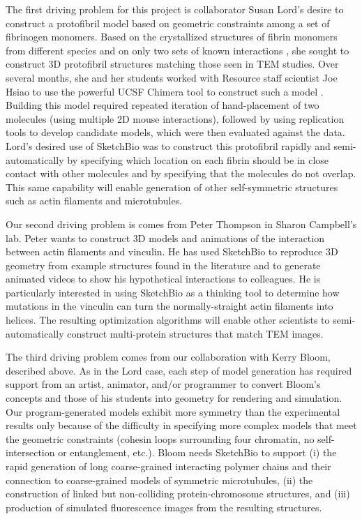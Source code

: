 \documentclass[twocolumn]{bmcart}%
\begin{document}
The first driving problem for this project is collaborator Susan Lord's desire to construct a protofibril model based on geometric constraints among a set of fibrinogen monomers.  Based on the crystallized structures of fibrin monomers from different species and on only two sets of known interactions \cite{lord2007fibrinogen}, she sought to construct 3D protofibril structures matching those seen in TEM studies.  Over several months, she and her students worked with Resource staff scientist Joe Hsiao to use the powerful UCSF Chimera tool to construct such a model \cite{lordSubmitted}.  Building this model required repeated iteration of hand-placement of two molecules (using multiple 2D mouse interactions), followed by using replication tools to develop candidate models, which were then evaluated against the data.  Lord's desired use of SketchBio was to construct this protofibril rapidly and semi-automatically by specifying which location on each fibrin should be in close contact with other molecules and by specifying that the molecules do not overlap.  This same capability will enable generation of other self-symmetric structures such as actin filaments and microtubules.

Our second driving problem is comes from Peter Thompson in Sharon Campbell's lab.  Peter wants to construct 3D models and animations of the interaction between actin filaments and vinculin.  He has used SketchBio to reproduce 3D geometry from example structures found in the literature and to generate animated videos to show his hypothetical interactions to colleagues.  He is particularly interested in using SketchBio as a thinking tool to determine how mutations in the vinculin can turn the normally-straight actin filaments into helices.  The resulting optimization algorithms will enable other scientists to semi-automatically construct multi-protein structures that match TEM images.

The third driving problem comes from our collaboration with Kerry Bloom, described above.  As in the Lord case, each step of model generation has required support from an artist, animator, and/or programmer to convert Bloom's concepts and those of his students into geometry for rendering and simulation.  Our program-generated models exhibit more symmetry than the experimental results only because of the difficulty in specifying more complex models that meet the geometric constraints (cohesin loops surrounding four chromatin, no self-intersection or entanglement, etc.).  Bloom needs SketchBio to support (i) the rapid generation of long coarse-grained interacting polymer chains and their connection to coarse-grained models of symmetric microtubules, (ii) the construction of linked but non-colliding protein-chromosome structures, and (iii) production of simulated fluorescence images from the resulting structures.
\end{document}

